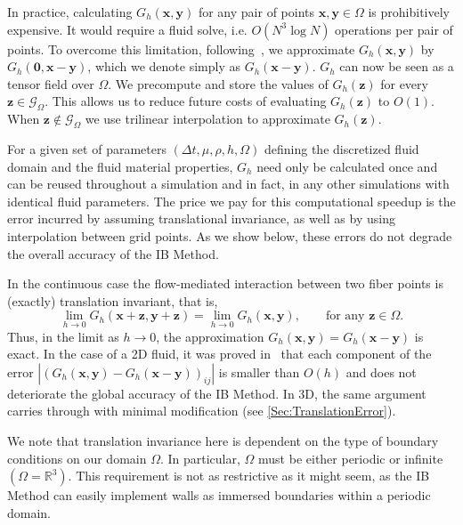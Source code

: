 \documentclass[preprint,12pt]{elsarticle}
\newcommand{\B}[1]{\mathbf{#1}}
\newcommand{\C}[1]{\mathcal{#1}}
\newcommand{\BB}[1]{\mathbb{#1}}
\renewcommand{\to}{\rightarrow}
\newcommand{\New}[1]{{\color{Red}#1}}
\begin{document}
In practice, calculating $G_h(\B{x},\B{y})$ for any pair of points $\B{x},\B{y}\in\Omega$ is prohibitively expensive. It would require a fluid solve, i.e. $O(N^3\log N)$ operations per pair of points. To overcome this limitation, following~\cite{IBM_Implicit2D},  we approximate $G_h(\B{x},\B{y})$ by $G_h(\B{0}, \B{x}-\B{y})$, which we denote simply as $G_h(\B{x}-\B{y})$.
$G_h$ can now be seen as a tensor field over $\Omega$. We precompute and store the values of $G_h(\B{z})$ for every $\B{z}\in\C{G}_\Omega$. This allows us to reduce future costs of evaluating $G_h(\B{z})$ to $O(1)$. When $\B{z}\notin\C{G}_\Omega$ we use trilinear interpolation to approximate $G_h(\B{z})$.

For a given set of parameters $(\Delta t, \mu, \rho, h, \Omega)$ defining the discretized fluid domain and the fluid material properties, $G_h$ need only be calculated once and can be reused throughout a simulation and in fact,  in any other simulations with identical fluid parameters. The price we pay for this computational speedup is the error incurred by assuming translational invariance, as well as by using interpolation between grid points. As we show below, these errors do not degrade the overall accuracy of the IB Method.


In the continuous case the flow-mediated interaction between two fiber points is (exactly) translation invariant, that is,
\begin{equation}
\lim_{h\to 0} G_h(\B{x} + \B{z},\B{y} + \B{z}) = \lim_{h\to 0}G_h(\B{x},\B{y}), \qquad\text{for any $\B{z}\in\Omega$}.
\end{equation}
Thus, in the limit as $h\to 0$,  the approximation $G_h(\B{x},\B{y})=G_h(\B{x}-\B{y})$ is exact.
In the case of a 2D fluid, it was proved in~\cite{IBM_Implicit2D} that each component of the error $|(G_h(\B{x},\B{y})-G_h(\B{x}-\B{y}))_{ij}|$ is smaller than $O(h)$ and does not deteriorate the global accuracy of the IB Method. In 3D, the same argument carries through with minimal modification (see \ref{Sec:TranslationError}).

\New{We note that translation invariance here is dependent on the type of boundary conditions on our domain $\Omega$. In particular, $\Omega$ must be either periodic or infinite $(\Omega = \BB{R}^3)$. This requirement is not as restrictive as it might seem, as the IB Method can easily implement walls as immersed boundaries within a periodic domain.}
\end{document}
